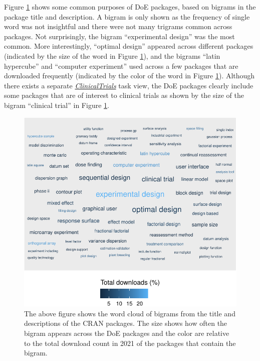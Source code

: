 \documentclass{article}
\begin{document}
Figure \ref{fig:wordcloud-over-time} shows some common purposes of DoE
packages, based on bigrams in the package title and description. A
bigram is only shown as the frequency of single word was not insightful
and there were not many trigrams common across packages. Not
surprisingly, the bigram ``experimental design'' was the most common.
More interestingly, ``optimal design'' appeared across different
packages (indicated by the size of the word in Figure
\ref{fig:wordcloud-over-time}), and the bigrams ``latin hypercube'' and
``computer experiment'' used across a few packages that are downloaded
frequently (indicated by the color of the word in Figure
\ref{fig:wordcloud-over-time}). Although there exists a separate
\href{http://CRAN.R-project.org/view=ClinicalTrials}{\emph{ClinicalTrials}}
task view, the DoE packages clearly include some packages that are of
interest to clinical trials as shown by the size of the bigram
``clinical trial'' in Figure \ref{fig:wordcloud-over-time}.

\begin{figure}[htbp]

{\centering \includegraphics{figures/wordcloud-over-time-1} 

}

\caption{The above figure shows the word cloud of bigrams from the title and descriptions of the CRAN packages. The size shows how often the bigram appears across the DoE packages and the color are relative to the total download count in 2021 of the packages that contain the bigram.}\label{fig:wordcloud-over-time}
\end{figure}
\end{document}
